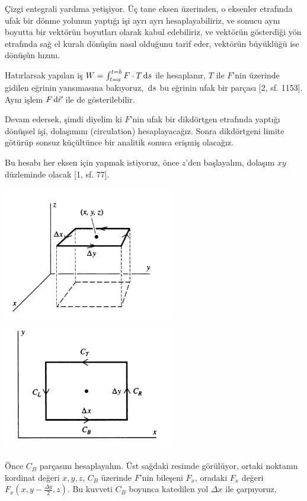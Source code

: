 \documentclass[12pt,fleqn]{article}\usepackage{../../common}
\begin{document}
Çizgi entegrali yardıma yetişiyor. Üç tane eksen üzerinden, o eksenler etrafında
ufak bir dönme yolunun yaptığı işi ayrı ayrı hesaplayabiliriz, ve sonucu aynı
boyutta bir vektörün boyutları olarak kabul edebiliriz, ve vektörün gösterdiği
yön etrafında sağ el kuralı dönüşün nasıl olduğunu tarif eder, vektörün
büyüklüğü ise dönüşün hızını. 

Hatırlarsak yapılan iş $W = \int_{t=a}^{t=b} F \cdot T \,\mathrm{d} s$ ile hesaplanır,
$T$ ile $F$'nin üzerinde gidilen eğrinin yansımasına bakıyoruz, $\,\mathrm{d} s$ bu
eğrinin ufak bir parçası [2, sf. 1153]. Aynı işlem $F \,\mathrm{d} \vec{r}$ ile de
gösterilebilir.

Devam edersek, şimdi diyelim ki $F$'nin ufak bir dikdörtgen etrafında yaptığı
dönüşsel işi, dolaşımını (circulation) hesaplayacağız. Sonra dikdörtgeni limite
götürüp sonsuz küçültünce bir analitik sonuca erişmiş olacağız.

Bu hesabı her eksen için yapmak istiyoruz, önce $z$'den başlayalım, dolaşım $xy$
düzleminde olacak [1, sf. 77].

\includegraphics[width=20em]{calc_multi_70_div_curl_lap_07.png}
\includegraphics[width=20em]{calc_multi_70_div_curl_lap_08.png}

Önce $C_B$ parçasını hesaplayalım. Üst sağdaki resimde görülüyor, ortaki
noktanın kordinat değeri $x,y,z$, $C_B$ üzerinde $F$'nin bileşeni $F_x$, oradaki
$F_x$ değeri $F_x(x,y-\frac{\Delta y}{2}, z)$. Bu kuvveti $C_B$ boyunca
katedilen yol $\Delta x$ ile çarpıyoruz,
\end{document}
